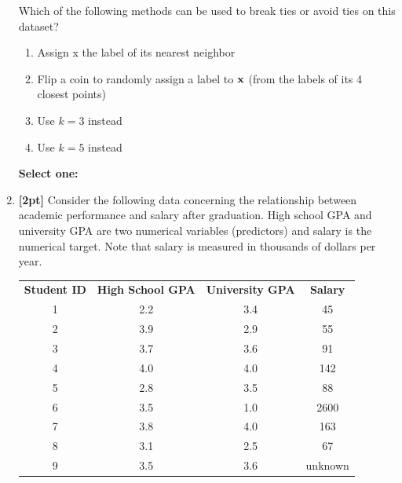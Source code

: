 \begin{enumerate}
    Which of the following methods can be used to break ties or avoid ties on this dataset?
    
    \begin{enumerate}
        \item Assign x the label of its nearest neighbor
        \item Flip a coin to randomly assign a label to $\mathbf{x}$ (from the labels of its 4 closest points)
        \item Use $k = 3$ instead
        \item Use $k = 5$ instead
    \end{enumerate}

    \textbf{Select one:}
    
 
    
    \newpage
    \item \textbf{[2pt]} Consider the following data concerning the relationship between academic performance and salary after graduation. High school GPA and university GPA are two numerical variables (predictors) and salary is the numerical target. Note that salary is measured in thousands of dollars per year.
    
    \begin{table}[H]
        \centering
        \begin{tabular}{cccc}
            \textbf{Student ID} & \textbf{High School GPA} & \textbf{University GPA} & \textbf{Salary} \\
            1 & 2.2 & 3.4 & 45 \\
            2 & 3.9 & 2.9 & 55 \\
            3 & 3.7 & 3.6 & 91 \\
            4 & 4.0 & 4.0 & 142 \\
            5 & 2.8 & 3.5 & 88 \\
            6 & 3.5 & 1.0 & 2600 \\
            7 & 3.8 & 4.0 & 163 \\
            8 & 3.1 & 2.5 & 67 \\
            9 & 3.5 & 3.6 & unknown \\
        \end{tabular}
        \label{tab:my_label}
    \end{table}
    

\end{enumerate}
